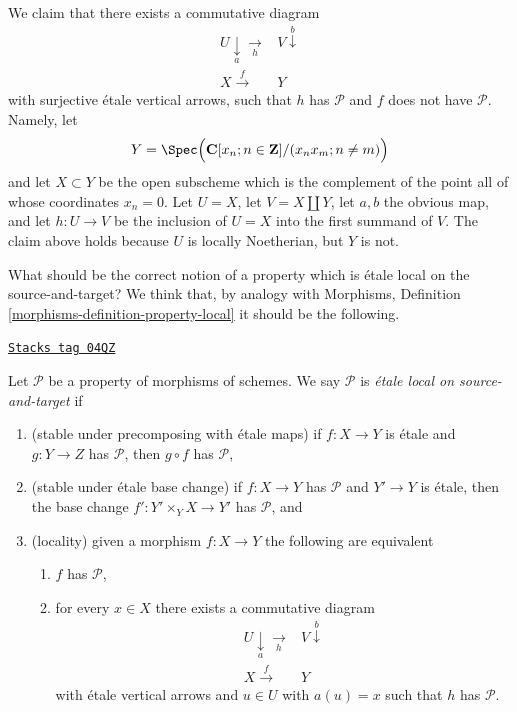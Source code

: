 \begin{example}
\medskip\noindent
We claim that there exists a commutative diagram
$$
\begin{array}{cc}U \underset{a}{\downarrow}\underset{h}{\longrightarrow} & V \overset{b}{\downarrow} \\ X \overset{f}{\longrightarrow} & Y\end{array}
$$
with surjective \'etale vertical arrows, such that $h$ has $\mathcal{P}$
and $f$ does not have $\mathcal{P}$. Namely, let
$$
Y =
\Spec\Big(
\mathbf{C}[x_n; n \in \mathbf{Z}]/(x_n x_m; n \not = m)
\Big)
$$
and let $X \subset Y$ be the open subscheme which is the complement of
the point all of whose coordinates $x_n = 0$. Let $U = X$, let
$V = X \amalg Y$, let $a, b$ the obvious map, and let $h : U \to V$
be the inclusion of $U = X$ into the first summand of $V$. The claim above
holds because $U$ is locally Noetherian, but $Y$ is not.
\end{example}

What should be the correct notion of a property which is \'etale local
on the source-and-target? We think that, by analogy with
Morphisms, Definition \ref{morphisms-definition-property-local}
it should be the following.

\begin{definition}
\label{descent-definition-local-source-target}
\href{https://stacks.math.columbia.edu/tag/04QZ}{\texttt{Stacks tag 04QZ}}

Let $\mathcal{P}$ be a property of morphisms of schemes.
We say $\mathcal{P}$ is {\it \'etale local on source-and-target} if
\begin{enumerate}
\item (stable under precomposing with \'etale maps)
if $f : X \to Y$ is \'etale and $g : Y \to Z$ has $\mathcal{P}$,
then $g \circ f$ has $\mathcal{P}$,
\item (stable under \'etale base change)
if $f : X \to Y$ has $\mathcal{P}$ and $Y' \to Y$ is \'etale, then
the base change $f' : Y' \times_Y X \to Y'$ has $\mathcal{P}$, and
\item (locality) given a morphism $f : X \to Y$ the following are equivalent
\begin{enumerate}
\item $f$ has $\mathcal{P}$,
\item for every $x \in X$ there exists a commutative diagram
$$
\begin{array}{cc}U \underset{a}{\downarrow}\underset{h}{\longrightarrow} & V \overset{b}{\downarrow} \\ X \overset{f}{\longrightarrow} & Y\end{array}
$$
with \'etale vertical arrows and $u \in U$ with $a(u) = x$ such that
$h$ has $\mathcal{P}$.
\end{enumerate}
\end{enumerate}
\end{definition}

